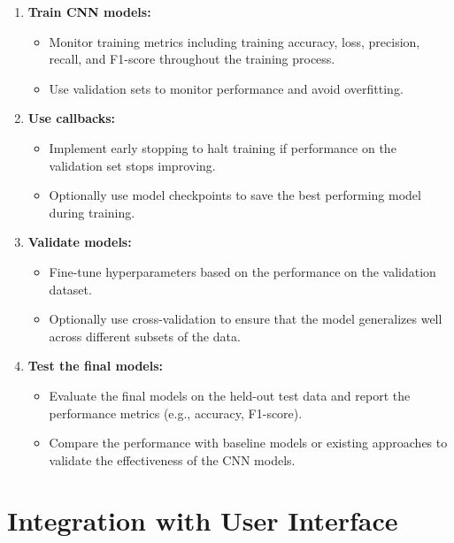 \begin{enumerate}
    \item \textbf{Train CNN models:}
    \begin{itemize}
        \item Monitor training metrics including training accuracy, loss, precision, recall, and F1-score throughout the training process.
        \item Use validation sets to monitor performance and avoid overfitting.
    \end{itemize}
    \item \textbf{Use callbacks:}
    \begin{itemize}
        \item Implement early stopping to halt training if performance on the validation set stops improving.
        \item Optionally use model checkpoints to save the best performing model during training.
    \end{itemize}
    \item \textbf{Validate models:}
    \begin{itemize}
        \item Fine-tune hyperparameters based on the performance on the validation dataset.
        \item Optionally use cross-validation to ensure that the model generalizes well across different subsets of the data.
    \end{itemize}
    \item \textbf{Test the final models:}
    \begin{itemize}
        \item Evaluate the final models on the held-out test data and report the performance metrics (e.g., accuracy, F1-score).
        \item Compare the performance with baseline models or existing approaches to validate the effectiveness of the CNN models.
    \end{itemize}
\end{enumerate}

\section{Integration with User Interface}

